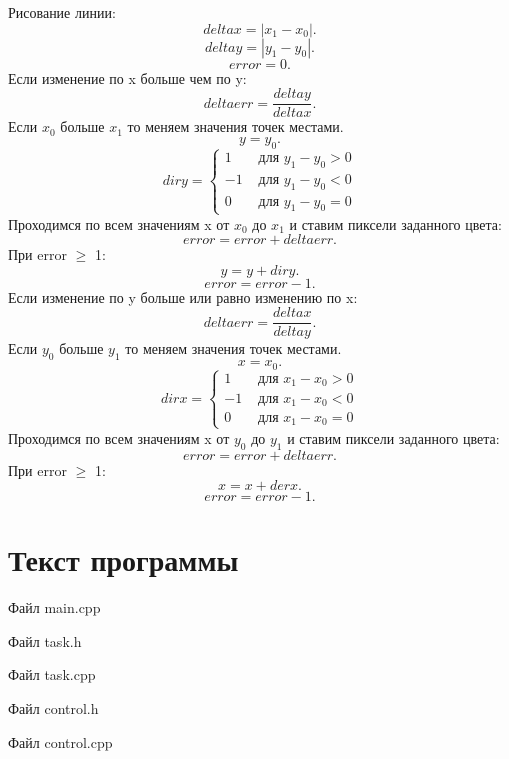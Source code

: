 \documentclass[14pt, a4paper]{extreport}
\begin{document}
Рисование линии:
$$ deltax = |x_1-x_0| . $$
$$ deltay = |y_1-y_0| . $$
$$ error = 0 . $$
Если изменение по x больше чем по y:
$$ deltaerr = \frac{deltay}{deltax} . $$
Если $x_0$ больше $x_1$ то меняем значения точек местами.
$$ y = y_0 . $$
\begin{equation*}
diry = \left\{
\begin{array}{lr}
1 & \text{ для } y_1-y_0 > 0 \\
-1 & \text{ для }y_1-y_0 < 0 \\
0 & \text{ для }y_1-y_0 = 0
\end{array}
\right.
\end{equation*}
Проходимся по всем значениям x от $x_0$ до $x_1$ и ставим пиксели заданного цвета:
$$ error = error + deltaerr. $$
При error $\geq$ 1:
$$ y = y + diry . $$
$$ error = error - 1 . $$
Если изменение по y больше или равно изменению по x:
$$ deltaerr = \frac{deltax}{deltay} . $$
Если $y_0$ больше $y_1$ то меняем значения точек местами.
$$ x = x_0 . $$
\begin{equation*}
dirx = \left\{
\begin{array}{lr}
1 & \text{ для } x_1-x_0 > 0 \\
-1 & \text{ для }x_1-x_0 < 0 \\
0 & \text{ для }x_1-x_0 = 0
\end{array}
\right.
\end{equation*}
Проходимся по всем значениям x от $y_0$ до $y_1$ и ставим пиксели заданного цвета:
$$ error = error + deltaerr. $$
При error $\geq$ 1:
$$ x = x + derx . $$
$$ error = error - 1 . $$

\chapter{Текст программы}

\noindent Файл main.cpp

\pagebreak
\hrulefill

\noindent Файл task.h

\hrulefill

\noindent Файл task.cpp

\hrulefill

\noindent Файл control.h

\hrulefill

\noindent Файл control.cpp


\end{document}
